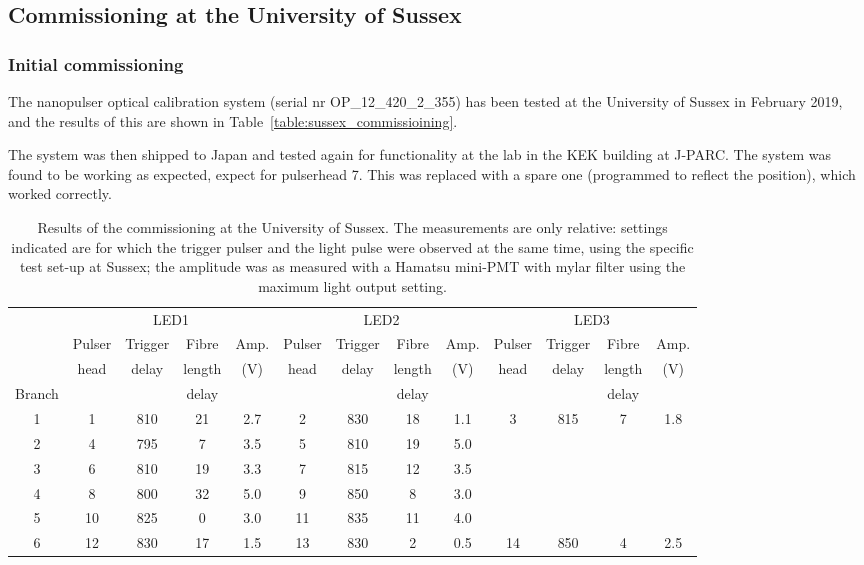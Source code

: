 

\subsection*{Commissioning at the University of Sussex}

\subsubsection*{Initial commissioning}

The nanopulser optical calibration system (serial nr OP\_12\_420\_2\_355) has been tested at the University of Sussex in February 2019, and the results of this are shown in Table~\ref{table:sussex_commissioining}.

The system was then shipped to Japan and tested again for functionality at the \jsns lab in the KEK building at J-PARC. The system was found to be working as expected, expect for pulserhead 7. This was replaced with a spare one (programmed to reflect the position), which worked correctly.

\begin{table}[h!]
  \begin{center}
    \caption{Results of the commissioning at the University of Sussex. The measurements are only relative: settings indicated are for which the trigger pulser and the light pulse were observed at the same time, using the specific test set-up at Sussex; the amplitude was as measured with a Hamatsu mini-PMT with mylar filter using the maximum light output setting.}
    \label{table:sussex_commissioning}
    \begin{tabular}{|c|c|c|c|c|c|c|c|c|c|c|c|c|} 
	\hline
	 & \multicolumn{4}{c|}{LED1} & \multicolumn{4}{c|}{LED2} & \multicolumn{4}{c|}{LED3} \\
	\cline{2-13}
		        & Pulser & Trigger  & Fibre  & Amp.
		        & Pulser & Trigger  & Fibre  & Amp.
		        & Pulser & Trigger  & Fibre  & Amp. \\
	              & head    & delay & length & (V) 
			 & head    & delay & length & (V) 
                    & head    & delay & length & (V) \\
	Branch    & & & delay & & & & delay & & & & delay & \\
       \hline 
	1 & 1 & 810 & 21 & 2.7 & 2 & 830 & 18 & 1.1 & 3 & 815 & 7 & 1.8 \\
	2 & 4 & 795 & 7  & 3.5 & 5 & 810 & 19 & 5.0 & & & & \\
	3 & 6 & 810 & 19 & 3.3 & 7 & 815 & 12 & 3.5 & & & & \\
	4 & 8 & 800 & 32 & 5.0 & 9 & 850 & 8 & 3.0 & & & & \\
	5 & 10 & 825 & 0 & 3.0 & 11 & 835 & 11 & 4.0 & & & & \\
	6 & 12 & 830 & 17 & 1.5 & 13 & 830 & 2 & 0.5 & 14 & 850 & 4 & 2.5 \\
	\hline
    \end{tabular}
  \end{center}
\end{table}

